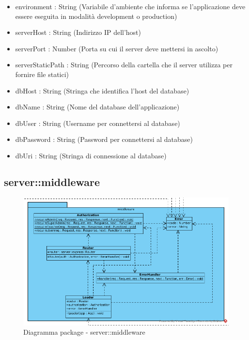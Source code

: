 \begin{description}
\begin{itemize}
\item environment : String (Variabile d'ambiente che informa se l'applicazione deve essere eseguita in modalità development o production)
\item serverHost : String (Indirizzo IP dell'host)
\item serverPort : Number (Porta su cui il server deve mettersi in ascolto)
\item serverStaticPath : String (Percorso della cartella che il server utilizza per fornire file statici)
\item dbHost : String (Stringa che identifica l'host del database)
\item dbName : String (Nome del database dell'applicazione)
\item dbUser : String (Username per connettersi al database)
\item dbPassword : String (Password per connettersi al database)
\item dbUri : String (Stringa di connessione al database)
\end{itemize}

\end{description}

\subsection{server::middleware}
\begin{center}
		\begin{figure}[H]
			\centering \includegraphics[scale=4, max width=\textwidth, max height=\myheight]{../img/diagrammiClassi/server/middleware.png}
			\caption{Diagramma package - server::middleware}
		\end{figure}
	\end{center}\hypertarget{server::middleware::Router}{}
